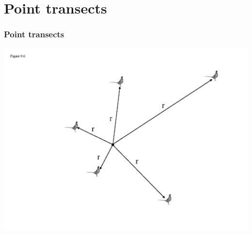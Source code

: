 \documentclass[color=usenames,dvipsnames]{beamer}\usepackage[]{graphicx}\usepackage[]{color}
\begin{document}






\section{Point transects}





\begin{frame}
  \frametitle{Point transects}
  \includegraphics[width=\textwidth]{figs/fig9-8}
\end{frame}







\end{document}
